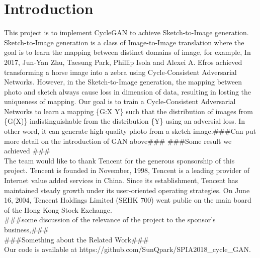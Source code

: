 \chapter{Introduction}\label{Ch:Introduction}
This project is to implement CycleGAN to achieve Sketch-to-Image generation. Sketch-to-Image generation is a class of Image-to-Image translation where the goal is to learn the mapping between distinct domains of image, for example, In 2017, Jun-Yan Zhu, Taesung Park, Phillip Isola and Alexei A. Efros achieved transforming a horse image into a zebra using Cycle-Consistent Adversarial Networks. However, in the Sketch-to-Image generation, the mapping between photo and sketch always cause loss in dimension of data, resulting in losting the uniqueness of mapping. Our goal is to train a Cycle-Consistent Adversarial Networks to learn a mapping \{G:X \rightarrow Y\} such that the distribution of images from \{G(X)\} indistinguishable from the distribution \{Y\} using an adversial loss. In other word, it can generate high quality photo from a sketch image.###Can put more detail on the introduction of GAN above### ###Some result we achieved ###\\

The team would like to thank Tencent for the generous sponsorship of this project. Tencent is founded in November, 1998, Tencent is a leading provider of Internet value added services in China. Since its establishment, Tencent has maintained steady growth under its user-oriented operating strategies. On June 16, 2004, Tencent Holdings Limited (SEHK 700) went public on the main board of the Hong Kong Stock Exchange.\\


###some discussion of the relevance of the project to the sponsor’s business,###\\



###Something about the Related Work###\\

Our code is available at https://github.com/SunQpark/SPIA2018_cycle_GAN.




\endinput
